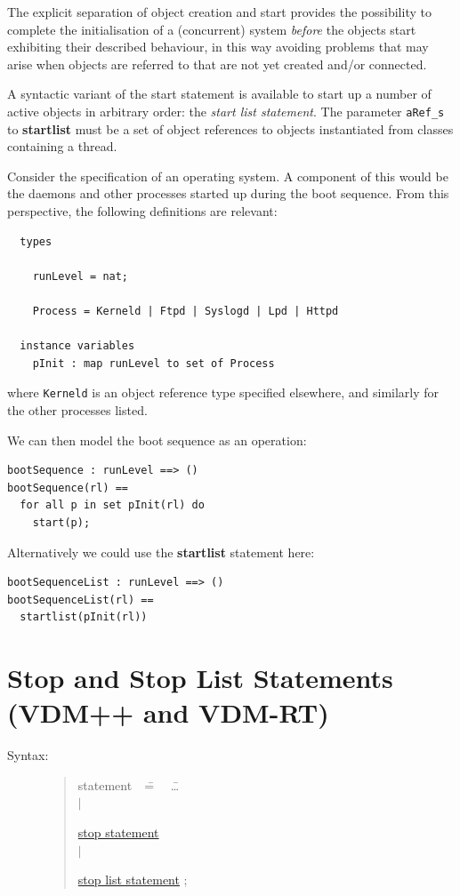 \documentclass{overturerepchap}
\newcommand{\Rule}[2]{
  \begin{quote}\begin{tabbing}
    #1\index{#1}\ \ \= = \ \ \= #2  ; %

  \end{tabbing}\end{quote}
  }
\newcommand{\Ruleref}[1]{
  \hyperlink{rule:#1}{#1}}
\newcommand{\dsep}{\\ \> $|$ \>}
\newcommand{\keyw}[1]{{\bf\ttfamily #1}}
\begin{document}
{\begin{description}
The explicit separation of object creation and start provides the
possibility to complete the initialisation of a (concurrent) system
{\it before} the objects start exhibiting their described behaviour,
in this way avoiding problems that may arise when objects are referred
to that are not yet created and/or connected.

A syntactic variant of the start statement is available to start up a
number of active objects in arbitrary order: the {\it start list
statement}. The parameter {\tt aRef\_s} to \keyw{startlist} must be a
set of object references to objects instantiated from classes
containing a thread.

\item[Examples:]
Consider the specification of an operating system. A component of this
would be the daemons and other processes started up during the boot
sequence. From this perspective, the following definitions are
relevant:
\begin{lstlisting}
  types

    runLevel = nat;

    Process = Kerneld | Ftpd | Syslogd | Lpd | Httpd

  instance variables
    pInit : map runLevel to set of Process
\end{lstlisting}
where \texttt{Kerneld} is an object reference type specified
elsewhere, and similarly for the other processes listed.

We can then model the boot sequence as an operation:
\begin{lstlisting}
bootSequence : runLevel ==> ()
bootSequence(rl) ==
  for all p in set pInit(rl) do
    start(p);
\end{lstlisting}
Alternatively we could use the \keyw{startlist} statement here:
\begin{lstlisting}
bootSequenceList : runLevel ==> ()
bootSequenceList(rl) ==
  startlist(pInit(rl))
\end{lstlisting}
\end{description}

\section{Stop and Stop List Statements (VDM++ and VDM-RT)}\label{sec:stop}
\label{sc:stopstmt}

\begin{description}
\item[Syntax:]
  \Rule{statement}{
    \ldots \dsep
    \Ruleref{stop statement} \dsep
    \Ruleref{stop list statement}
    }


\end{description}}
\end{document}
